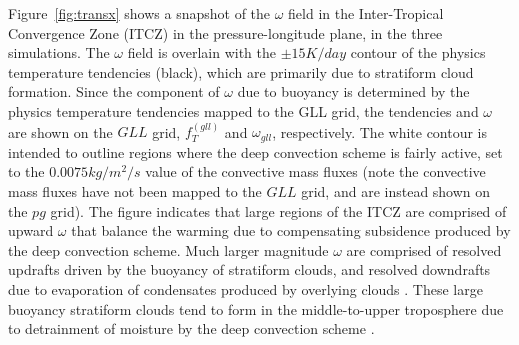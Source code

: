 \documentclass{agujournal}
\begin{document}
Figure~\ref{fig:transx} shows a snapshot of the $\omega$ field in the Inter-Tropical Convergence Zone (ITCZ) in the pressure-longitude plane, in the three simulations. The $\omega$ field is overlain with the $\pm 15 K/day$ contour of the physics temperature tendencies (black), which are primarily due to stratiform cloud formation. Since the component of $\omega$ due to buoyancy is determined by the physics temperature tendencies mapped to the GLL grid, the tendencies and $\omega$ are shown on the $GLL$ grid, $f_T^{(gll)}$ and $\omega_{gll}$, respectively. The white contour is intended to outline regions where the deep convection scheme is fairly active, set to the $0.0075 kg/m^2/s$ value of the convective mass fluxes (note the convective mass fluxes have not been mapped to the $GLL$ grid, and are instead shown on the $pg$ grid). The figure indicates that large regions of the ITCZ are comprised of upward $\omega$ that balance the warming due to compensating subsidence produced by the deep convection scheme. Much larger magnitude $\omega$ are comprised of resolved updrafts driven by the buoyancy of stratiform clouds, and resolved downdrafts due to evaporation of condensates produced by overlying clouds \citep{HR2018JAMES}. These large buoyancy stratiform clouds tend to form in the middle-to-upper troposphere due to detrainment of moisture by the deep convection scheme \citep{ZM1995AO}. 
\end{document}
